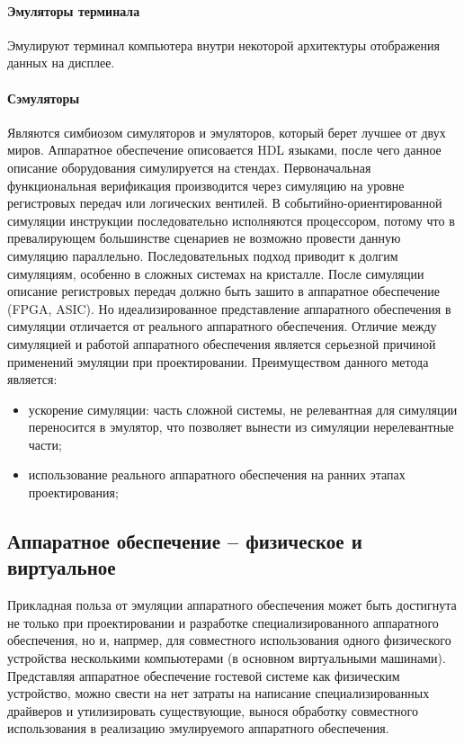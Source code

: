 \paragraph{Эмуляторы терминала}\label{term-emu}

Эмулируют терминал компьютера внутри некоторой архитектуры отображения данных на дисплее.


\paragraph{Сэмуляторы}\label{sim-emu}

Являются симбиозом симуляторов и эмуляторов, который берет лучшее от двух миров.
Аппаратное обеспечение описовается HDL языками, после чего данное описание оборудования симулируется на стендах.
Первоначальная функциональная верификация производится через симуляцию на уровне регистровых передач или логических вентилей.
В событийно-ориентированной симуляции инструкции последовательно исполняются процессором, потому что в превалирующем большинстве
сценариев не возможно провести данную симуляцию параллельно. Последовательных подход приводит к долгим симуляциям, особенно в
сложных системах на кристалле.
После симуляции описание регистровых передач должно быть зашито в аппаратное обеспечение (FPGA, ASIC).
Но идеализированное представление аппаратного обеспечения в симуляции отличается от реального аппаратного обеспечения.
Отличие между симуляцией и работой аппаратного обеспечения является серьезной причиной применений эмуляции при
проектировании.
Преимуществом данного метода является:
\begin{itemize}
    \item ускорение симуляции: часть сложной системы, не релевантная для симуляции переносится в эмулятор,
          что позволяет вынести из симуляции нерелевантные части;
    \item использование реального аппаратного обеспечения на ранних этапах проектирования;
\end{itemize}


\subsection{Аппаратное обеспечение -- физическое и виртуальное}\label{sec:ch1/sec1/sub1}

Прикладная польза от эмуляции аппаратного обеспечения может быть достигнута не только
при проектировании и разработке специализированного аппаратного обеспечения, но и, напрмер,
для совместного использования одного физического устройства несколькими компьютерами (в основном
виртуальными машинами).
Представляя аппаратное обеспечение гостевой системе как физическим устройство, можно
свести на нет затраты на написание специализированных драйверов и утилизировать
существующие, вынося обработку совместного использования в реализацию эмулируемого аппаратного обеспечения.

